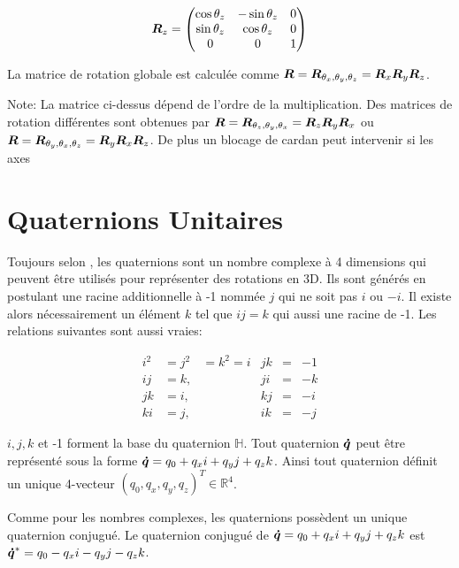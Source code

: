 \documentclass[12pt,a4paper]{report}
\begin{document}
\begin{appendix}
		\begin{equation*}
		\boldsymbol{R}_z = \begin{pmatrix}
		\cos{\theta_z} & -\sin{\theta_z}& 0 \\
		\sin{\theta_z} & \cos{\theta_z} & 0 \\
		0 & 0 & 1
		\end{pmatrix}
 		\end{equation*}
 		
 		\para La matrice de rotation globale est calculée comme $\boldsymbol{R} = \boldsymbol{R}_{\theta_x, \theta_y, \theta_z} = \boldsymbol{R}_x \boldsymbol{R}_y \boldsymbol{R}_z$.
 		
 		\para Note: La matrice ci-dessus dépend de l'ordre de la multiplication. Des matrices de rotation différentes sont obtenues par $\boldsymbol{R} = \boldsymbol{R}_{\theta_z, \theta_y, \theta_x} = \boldsymbol{R}_z \boldsymbol{R}_y \boldsymbol{R}_x$ ou $\boldsymbol{R} = \boldsymbol{R}_{\theta_y, \theta_x, \theta_z} = \boldsymbol{R}_y \boldsymbol{R}_x \boldsymbol{R}_z$. De plus un blocage de cardan peut intervenir si les axes 
		
		\section{Quaternions Unitaires}
		Toujours selon \cite{nuchter_3d_2009}, les quaternions sont un nombre complexe à 4 dimensions qui peuvent être utilisés pour représenter des rotations en 3D. Ils sont générés en postulant une racine additionnelle à -1 nommée $j$ qui ne soit pas $i$ ou $-i$. Il existe alors nécessairement un élément $k$ tel que $ij = k$ qui aussi une racine de -1. Les relations suivantes sont aussi vraies:
		

		\begin{equation*}
		\begin{aligned}
			i^2&= j^2 & = k^2 = i&jk &=& -1 \\
			ij &= k, &           &ji &=& -k \\
			jk &= i,&            &kj &=& -i \\
			ki &=j, &            &ik &=& -j
		\end{aligned}
		\end{equation*}
		
		\para $i,j,k$ et -1 forment la base du quaternion $\mathbb{H}$. Tout quaternion $\boldsymbol{\dot{q}}$ peut être représenté sous la forme $\boldsymbol{\dot{q}} = q_0 + q_xi + q_yj+q_zk$. Ainsi tout quaternion définit un unique 4-vecteur $(q_0, q_x, q_y, q_z)^T \in \mathbb{R}^4$. 
		
		\para Comme pour les nombres complexes, les quaternions possèdent un unique quaternion conjugué. Le quaternion conjugué de $\boldsymbol{\dot{q}} = q_0 + q_xi + q_yj+q_zk$ est $\boldsymbol{\dot{q}}^\ast = q_0 - q_xi - q_yj-q_zk$.
		

\end{appendix}
\end{document}
